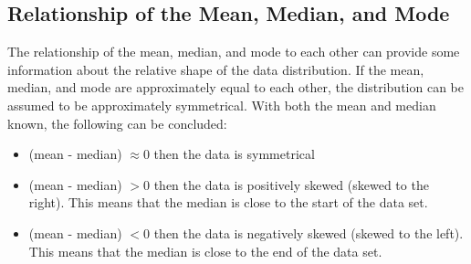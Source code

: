 \subsection{Relationship of the Mean, Median, and Mode}

The relationship of the mean, median, and mode to each other can provide some information about the relative shape of the data distribution. If the mean, median, and mode are approximately equal to each other, the distribution can be assumed to be approximately symmetrical.
With both the mean and median known, the following can be concluded:
\begin{itemize}
\item (mean - median) $\approx 0$ then the data is symmetrical 
\item (mean - median) $>0$ then the data is positively skewed (skewed to the right). This means that the median is close to the start of the data set.
\item (mean - median) $<0$ then the data is negatively skewed (skewed to the left). This means that the median is close to the end of the data set.
\end{itemize}

